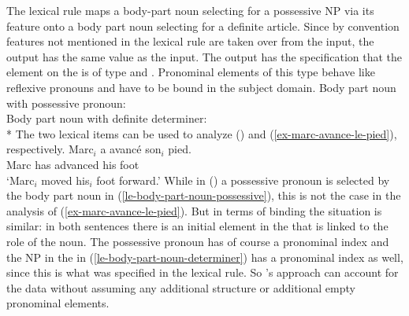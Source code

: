 \documentclass[output=paper
 	        ,biblatex
                ,babelshorthands
                ,newtxmath
                ,draftmode
                ,colorlinks, citecolor=brown
]{langscibook}
\begin{document}
\noindent
The lexical rule maps a body-part noun selecting for a possessive NP  via its \spr feature onto a
body part noun selecting for a definite article. Since by convention features not mentioned in the
lexical rule are taken over from the input, the output has the same \cont value as the input. The
output has the specification that the element on the \argst is of type  and
. Pronominal elements of this type behave like reflexive pronouns and have to be bound
in the subject domain.
\eal
\ex 
\label{le-body-part-noun-possessive}
Body part noun with possessive pronoun:\\
\ex 
\label{le-body-part-noun-determiner}
Body part noun with definite determiner:\\*
\zl 
The two lexical items can be used to analyze () and (\ref{ex-marc-avance-le-pied}), respectively.
\ea
\gll Marc$_i$ a   avancé   son$_i$ pied.\\
     Marc     has advanced his     foot\\
\glt `Marc$_i$ moved his$_i$ foot forward.'
\z
While in () a possessive pronoun is selected by the body part noun in
(\ref{le-body-part-noun-possessive}), this is not the case in the analysis of
(\ref{ex-marc-avance-le-pied}). But in terms of binding the situation is similar: in both sentences
there is an initial element in the \argst that is linked to the  role of the
noun. The possessive pronoun has of course a pronominal index and the NP in the \argst in
(\ref{le-body-part-noun-determiner}) has a pronominal index as well, since this is what was
specified in the lexical rule. So \citeauthor{Koenig1999b}'s approach can account for the data
without assuming any additional structure or additional empty pronominal elements.
\end{document}
